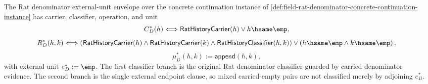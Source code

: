 \begin{definition}
\label{def:field-rat-denominator-unit-envelope}
The Rat denominator external-unit envelope over the concrete continuation
instance of
\autoref{def:field-rat-denominator-concrete-continuation-instance} has carrier,
classifier, operation, and unit
$$
C_D^\ast(h)\Longleftrightarrow
\mathsf{RatHistoryCarrier}(h)\lor h\hsame\emp,
$$
$$
R_D^\ast(h,k)\Longleftrightarrow
\left(
\mathsf{RatHistoryCarrier}(h)\land
\mathsf{RatHistoryCarrier}(k)\land
\mathsf{RatHistoryClassifier}(h,k)
\right)
\lor
\left(h\hsame\emp\land k\hsame\emp\right),
$$
$$
\mu_D^\ast(h,k):=\mathsf{append}(h,k),
$$
with external unit $e_D^\ast:=\emp$. The first classifier branch is the original
Rat denominator classifier guarded by carried denominator evidence. The second
branch is the single external endpoint clause, so mixed carried-empty pairs are
not classified merely by adjoining $e_D^\ast$.
\end{definition}

